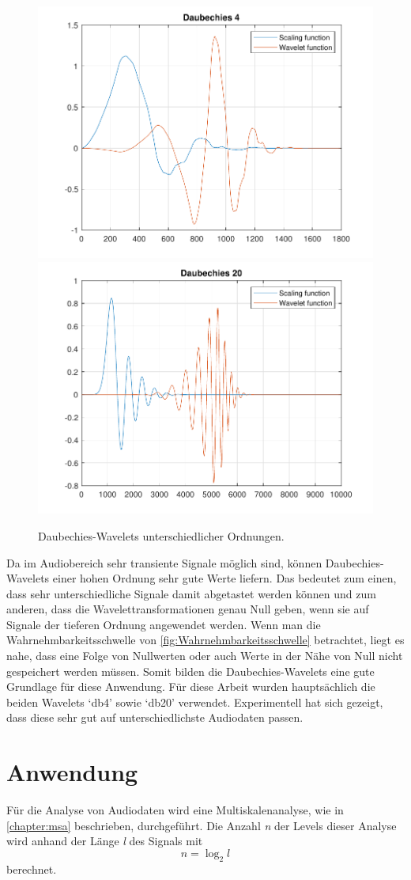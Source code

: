 \begin{refsection}
\begin{figure}
	\includegraphics[width=0.5\linewidth]{papers/compress/Bilder/db4}
	\includegraphics[width=0.5\linewidth]{papers/compress/Bilder/db20}
	\label{fig:dbN}
	\caption{Daubechies-Wavelets unterschiedlicher Ordnungen.}
\end{figure}

Da im Audiobereich sehr transiente Signale möglich sind, können Daubechies-Wavelets einer hohen Ordnung sehr gute Werte liefern.
Das bedeutet zum einen, dass sehr unterschiedliche Signale damit abgetastet werden können und zum anderen, dass die Wavelettransformationen genau Null geben, wenn sie auf Signale der tieferen Ordnung angewendet werden.
Wenn man die Wahrnehmbarkeitsschwelle von \autoref{fig:Wahrnehmbarkeitsschwelle} betrachtet, liegt es nahe, dass eine Folge von Nullwerten oder auch Werte in der Nähe von Null nicht gespeichert werden müssen.
Somit bilden die Daubechies-Wavelets eine gute Grundlage für diese Anwendung.
Für diese Arbeit wurden hauptsächlich die beiden Wavelets `db4' sowie `db20' verwendet.
Experimentell hat sich gezeigt, dass diese sehr gut auf unterschiedlichste Audiodaten passen.

\section{Anwendung}
Für die Analyse von Audiodaten wird eine Multiskalenanalyse, wie in \autoref{chapter:msa} beschrieben, durchgeführt.
Die Anzahl \textit{n} der Levels dieser Analyse wird anhand der Länge \textit{l} des Signals mit
\begin{equation}
\textit{n} = \log_2{\textit{l}}
\end{equation}
berechnet.


\end{refsection}
